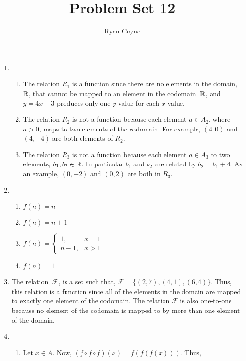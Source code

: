 \documentclass[12pt]{article}
\newcommand{\mc}[1]{\mathcal{#1}}
\begin{document}
\title{Problem Set 12}
\author{Ryan Coyne}
\maketitle

\begin{enumerate}
    \item \begin{enumerate}
        \item The relation \(R_1\) is a function since there are no elements in the domain, \(\mathbb{R}\), that cannot be mapped to an element in the codomain, \(\mathbb{R}\), and \(y=4x-3\) produces only one \(y\) value for each \(x\) value.
        \item The relation \(R_2\) is not a function because each element \(a\in A_2\), where \(a>0\), maps to two elements of the codomain. For example, \((4,0)\) and \((4,-4)\) are both elements of \(R_2\).
        \item The relation \(R_3\) is not a function because each element \(a\in A_3\) to two elements, \(b_1, b_2 \in \mathbb{R}\). In particular \(b_1\) and \(b_2\) are related by \(b_2 = b_1 + 4\). As an example, \((0,-2)\) and \((0,2)\) are both in \(R_3\).
    \end{enumerate}
    \item \begin{enumerate}
        \item \(f(n) = n\)
        \item \(f(n) = n + 1\)
        \item \(f(n) = \begin{cases}
            1 ,& x = 1\\
            n-1, & x > 1
        \end{cases}\)
        \item \(f(n) = 1\)
    \end{enumerate}
    \item The relation, \(\mc F\), is a set such that, \(\mc F = \{(2,7), (4,1), (6, 4)\}\). Thus, this relation is a function since all of the elements in the domain are mapped to exactly one element of the codomain. The relation \(\mc F\) is also one-to-one because no element of the codomain is mapped to by more than one element of the domain. 
    \item \begin{enumerate}
        \item Let \(x\in A\). Now, \((f\circ f\circ f)(x) = f(f(f(x)))\). Thus, \begin{equation*}

\end{equation*}
\end{enumerate}
\end{enumerate}
\end{document}
